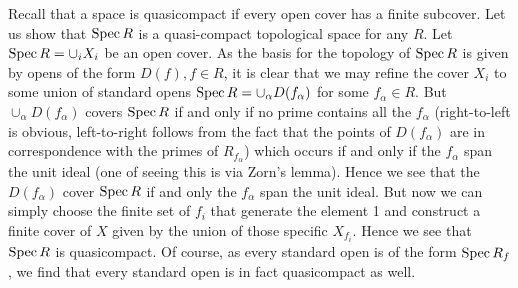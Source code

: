\documentclass{../../mathnotes}
\begin{document}
Recall that a space is quasicompact if every open cover has a finite subcover. Let us show that $\operatorname{Spec} R$ is
a quasi-compact topological space for any $R$. Let $\operatorname{Spec} R=\cup_iX_i$ be an open cover. As the basis for the topology of $\operatorname{Spec} R$
is given by opens of the form $D(f), f\in R$, it is clear that we may refine the cover $X_i$ to some union of standard opens
$\operatorname{Spec} R=\cup_\alpha D(f_\alpha)$ for some $f_\alpha\in R$. But $\cup_\alpha D(f_\alpha)$ covers $\operatorname{Spec} R$ if and only if no
prime contains all the $f_\alpha$ (right-to-left is obvious, left-to-right follows from the fact that the points of $D(f_\alpha)$ are in
correspondence with the primes of $R_{f_\alpha}$) which occurs if and only if the $f_\alpha$
span the unit ideal (one of seeing this is via Zorn's lemma).
Hence we see that the $D(f_\alpha)$
cover $\operatorname{Spec} R$ if and only the $f_\alpha$ span the unit ideal. But now we can simply choose the finite set of $f_i$ that generate the element
1 and construct a finite cover of $X$ given by the union of those specific $X_{f_i}$. Hence we see that $\operatorname{Spec} R$ is quasicompact.
Of course, as every standard open is of the form $\operatorname{Spec} R_f$, we find that every standard open is in fact quasicompact as well.
\end{document}
